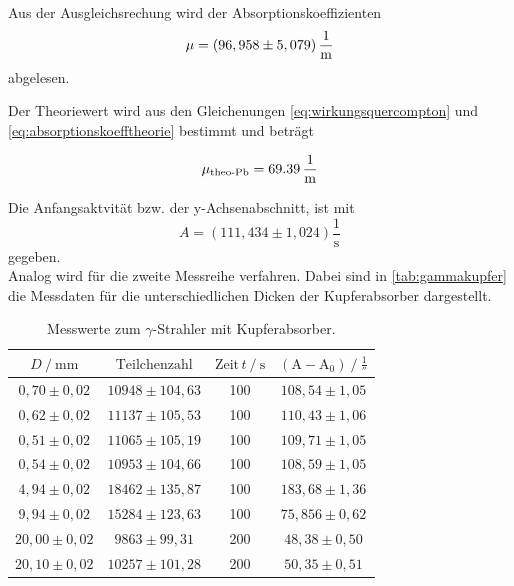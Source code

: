 Aus der Ausgleichsrechung wird der Absorptionskoeffizienten 
\begin{equation*}
    \mu =  \left( 96,958 \pm 5,079 \right) \unit{\dfrac{1}{\meter}}
\end{equation*}
abgelesen.

Der Theoriewert wird aus den Gleichenungen \eqref{eq:wirkungsquercompton} und  \eqref{eq:absorptionskoefftheorie} bestimmt und beträgt

\begin{equation}
    \mu_{\text{theo-Pb}} =  69.39 \, \unit{\dfrac{1}{\meter}}
    \label{eq:absorpttheoPb}
\end{equation}

Die Anfangsaktvität bzw. der y-Achsenabschnitt, ist mit 
\begin{equation*}
    A =  \left( 111,434 \pm 1,024 \right)  \dfrac{1}{\unit{\second}}
\end{equation*}
gegeben. \\

Analog wird für die zweite Messreihe verfahren.
Dabei sind in \autoref{tab:gammakupfer} die Messdaten für die unterschiedlichen Dicken der Kupferabsorber dargestellt.

\begin{table}[H]
    \centering
    \caption{Messwerte zum $\gamma$-Strahler mit Kupferabsorber.}
    \label{tab:gammakupfer}
    \begin{tabular}{S[table-format=2.2] S[table-format=5.0] S[table-format=3.0] S}
      \toprule
      {$D \mathbin{/} \unit{\milli\meter} $} & {$\text{Teilchenzahl}$} & {$\text{Zeit} \,t \mathbin{/} \unit{\second}$} &{$ \left(\text{A}- \text{A}_0 \right) \mathbin{/} \unit{\frac{1}{\second}}$} \\
      \midrule
      {$ 0,70 \pm 0,02$}          &    {$  10948 \pm 104,63    $} &      100  	& {$108,54  \pm 1,05$} \\
      {$ 0,62 \pm 0,02$}          &    {$  11137 \pm 105,53    $} &      100  	& {$110,43  \pm 1,06$} \\
      {$ 0,51 \pm 0,02$}          &    {$  11065 \pm 105,19    $} &      100  	& {$109,71  \pm 1,05$} \\
      {$ 0,54 \pm 0,02$}          &    {$  10953 \pm 104,66    $} &      100  	& {$108,59  \pm 1,05$} \\
      {$ 4,94 \pm 0,02$}          &    {$  18462 \pm 135,87    $} &      100  	& {$183,68  \pm 1,36$} \\
      {$ 9,94 \pm 0,02$}          &    {$  15284 \pm 123,63    $} &      100  	& {$75,856  \pm 0,62$} \\
      {$20,00 \pm 0,02$}          &    {$   9863 \pm 99,31     $} &      200  	& {$ 48,38  \pm 0,50$} \\
      {$20,10 \pm 0,02$}          &    {$  10257 \pm 101,28    $} &      200  	& {$ 50,35  \pm 0,51$} \\
      \bottomrule
    \end{tabular}
  \end{table}

